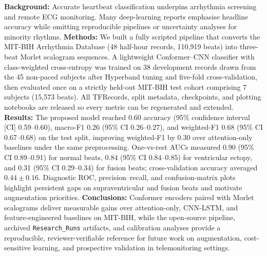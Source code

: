 \textbf{Background:} Accurate heartbeat classification underpins arrhythmia screening and remote ECG monitoring.
Many deep-learning reports emphasise headline accuracy while omitting reproducible pipelines or uncertainty analyses for minority rhythms.
\textbf{Methods:} We built a fully scripted pipeline that converts the MIT-BIH Arrhythmia Database (48 half-hour records, 110{,}919 beats) into three-beat Morlet scalogram sequences.
A lightweight Conformer--CNN classifier with class-weighted cross-entropy was trained on 38 development records drawn from the 45 non-paced subjects after Hyperband tuning and five-fold cross-validation, then evaluated once on a strictly held-out MIT-BIH test cohort comprising 7 subjects (15{,}573 beats).
All TFRecords, split metadata, checkpoints, and plotting notebooks are released so every metric can be regenerated and extended.
\textbf{Results:} The proposed model reached 0.60 accuracy (95\% confidence interval [CI] 0.59--0.60), macro-F1 0.26 (95\% CI 0.26--0.27), and weighted-F1 0.68 (95\% CI 0.67--0.68) on the test split, improving weighted-F1 by 0.30 over attention-only baselines under the same preprocessing.
One-vs-rest AUCs measured 0.90 (95\% CI 0.89--0.91) for normal beats, 0.84 (95\% CI 0.84--0.85) for ventricular ectopy, and 0.31 (95\% CI 0.29--0.34) for fusion beats; cross-validation accuracy averaged $0.44\pm0.16$.
Diagnostic ROC, precision--recall, and confusion-matrix plots highlight persistent gaps on supraventricular and fusion beats and motivate augmentation priorities.
\textbf{Conclusions:} Conformer encoders paired with Morlet scalograms deliver measurable gains over attention-only, CNN-LSTM, and feature-engineered baselines on MIT-BIH, while the open-source pipeline, archived \texttt{Research\_Runs} artifacts, and calibration analyses provide a reproducible, reviewer-verifiable reference for future work on augmentation, cost-sensitive learning, and prospective validation in telemonitoring settings.
